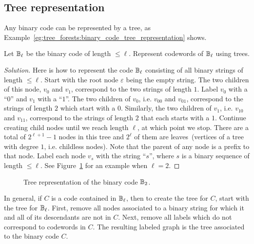 
\subsection{Tree representation}

Any binary code can be represented by a tree, as
Example~\ref{eg:tree_forests:binary_code_tree_representation} shows.

\begin{example}
\label{eg:tree_forests:binary_code_tree_representation}
Let $\mathbb{B}_\ell$ be the binary code of length
$\leq \ell$. Represent codewords of $\mathbb{B}_\ell$ using trees.
\end{example}

\begin{proof}[Solution]
Here is how to represent the code $\mathbb{B}_\ell$ consisting of all binary
strings of length $\leq \ell$. Start with the
root node $\varepsilon$\index{$\varepsilon$}
being the empty string. The two children of this node, $v_0$ and
$v_1$, correspond to the two strings of length $1$. Label $v_0$ with a
``$0$'' and $v_1$ with a ``$1$''. The two children of $v_0$,
i.e. $v_{00}$ and $v_{01}$, correspond to the strings of length $2$
which start with a $0$. Similarly, the two children of $v_1$,
i.e. $v_{10}$ and $v_{11}$, correspond to the strings of length $2$
that each starts with a $1$. Continue creating child nodes until we
reach length $\ell$, at which point we stop. There are a total of
$2^{\ell + 1} - 1$ nodes in this tree and $2^\ell$ of them are
leaves~(vertices of a tree with degree $1$, i.e. childless
nodes). Note that the parent of any node is a prefix to that
node. Label each node $v_s$ with the string ``$s$'', where $s$ is a
binary sequence of length $\leq \ell$. See
Figure~\ref{fig:trees_forests:tree_representation_B_2} for an example
when $\ell = 2$.
\end{proof}

\begin{figure}[!htbp]
\centering
{}

\caption{Tree representation of the binary code $\mathbb{B}_2$.}
\label{fig:trees_forests:tree_representation_B_2}
\end{figure}

In general, if $C$ is a code contained in $\mathbb{B}_\ell$, then to create
the tree for $C$, start with the tree
for $\mathbb{B}_\ell$. First, remove all nodes associated to a binary string
for which it and all of its descendants are not in $C$. Next, remove
all labels which do not correspond to codewords in $C$. The resulting
labeled graph is the tree associated to the binary code $C$.

